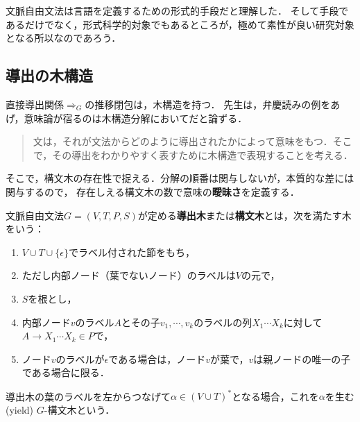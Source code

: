 \documentclass[uplatex, dvipdfmx]{jsreport}
\begin{document}
\begin{screen}
    文脈自由文法は言語を定義するための形式的手段だと理解した．
    そして手段であるだけでなく，形式科学的対象でもあるところが，極めて素性が良い研究対象となる所以なのであろう．
\end{screen}

\subsection{導出の木構造}

\begin{tcolorbox}[colframe=ForestGreen, colback=ForestGreen!10!white, breakable]
    直接導出関係$\Rightarrow_G$の推移閉包は，木構造を持つ．
    先生は，弁慶読みの例をあげ，意味論が宿るのは木構造分解においてだと論ずる．
    \begin{quote}
        文は，それが文法からどのように導出されたかによって意味をもつ．そこで，その導出をわかりやすく表すために木構造で表現することを考える．
    \end{quote}
    そこで，構文木の存在性で捉える．分解の順番は関与しないが，本質的な差には関与するので，
    存在しえる構文木の数で意味の\textbf{曖昧さ}を定義する．
\end{tcolorbox}

\begin{definition}
    文脈自由文法$G=(V,T,P,S)$が定める\textbf{導出木}または\textbf{構文木}とは，次を満たす木をいう：
    \begin{enumerate}
        \item $V\cup T\cup\{\epsilon\}$でラベル付された節をもち，
        \item ただし内部ノード（葉でないノード）のラベルは$V$の元で，
        \item $S$を根とし，
        \item 内部ノード$v$のラベル$A$とその子$v_1,\cdots,v_k$のラベルの列$X_1\cdots X_k$に対して$A\rightarrow X_1\cdots X_k\in P$で，
        \item ノード$v$のラベルが$\epsilon$である場合は，ノード$v$が葉で，$v$は親ノードの唯一の子である場合に限る．
    \end{enumerate}
    導出木の葉のラベルを左からつなげて$\alpha\in (V\cup T)^*$となる場合，これを$\alpha$を生む(yield) $G$-構文木という．
\end{definition}
\end{document}
